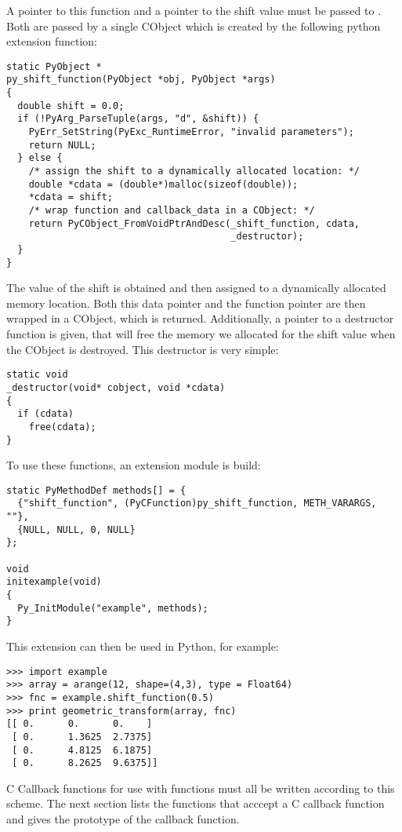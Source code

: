 A pointer to this function and a pointer to the shift value must be passed 
to . Both are passed by a single CObject 
which is created by the following python extension function:
\begin{verbatim}
static PyObject *
py_shift_function(PyObject *obj, PyObject *args)
{
  double shift = 0.0;
  if (!PyArg_ParseTuple(args, "d", &shift)) {
    PyErr_SetString(PyExc_RuntimeError, "invalid parameters");
    return NULL;
  } else {
    /* assign the shift to a dynamically allocated location: */
    double *cdata = (double*)malloc(sizeof(double));
    *cdata = shift;
    /* wrap function and callback_data in a CObject: */
    return PyCObject_FromVoidPtrAndDesc(_shift_function, cdata,
                                        _destructor);
  }
}
\end{verbatim}
The value of the shift is obtained and then assigned to a dynamically 
allocated memory location. Both this data pointer and the function pointer 
are then wrapped in a CObject, which is returned. Additionally, a pointer 
to a destructor function is given, that will free the memory we allocated 
for the shift value when the CObject is destroyed. This destructor is very 
simple:
\begin{verbatim}
static void
_destructor(void* cobject, void *cdata)
{
  if (cdata)
    free(cdata);
}
\end{verbatim}
To use these functions, an extension module is build:
\begin{verbatim}
static PyMethodDef methods[] = {
  {"shift_function", (PyCFunction)py_shift_function, METH_VARARGS, ""},
  {NULL, NULL, 0, NULL}
};

void
initexample(void)
{
  Py_InitModule("example", methods);
}
\end{verbatim}
This extension can then be used in Python, for example:
\begin{verbatim}
>>> import example
>>> array = arange(12, shape=(4,3), type = Float64)
>>> fnc = example.shift_function(0.5)
>>> print geometric_transform(array, fnc)
[[ 0.      0.      0.    ]
 [ 0.      1.3625  2.7375]
 [ 0.      4.8125  6.1875]
 [ 0.      8.2625  9.6375]]
\end{verbatim}

C Callback functions for use with  functions must all be 
written according to this scheme. The next section lists the 
 functions that acccept a C callback function and gives 
the prototype of the callback function.

